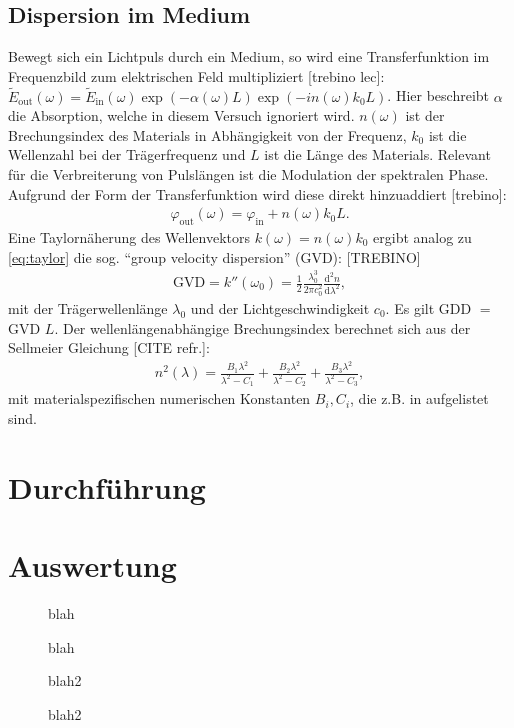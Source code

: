 \documentclass[twoside,        %
               BCOR12mm,       %
               english,ngerman, %
               fleqn,headsepline=false,footsepline=false
              ]{Vorlage/MFPREPORT}
\renewcommand{\d}{\ensuremath{\mathrm{d}}} %
\newcommand{\diff}[3][]{\ensuremath{\frac{\d^{#1}#2}{\d#3^{#1}}}} %
\begin{document}
\subsection{Dispersion im Medium}
Bewegt sich ein Lichtpuls durch ein Medium, so wird eine Transferfunktion im Frequenzbild zum elektrischen Feld multipliziert [trebino lec]: $\tilde E_{\text{out}}(\omega)=\tilde{E}_{\text{in}}(\omega)\exp(-\alpha(\omega)L)\exp(-i n(\omega)k_0L)$. Hier beschreibt $\alpha$ die Absorption, welche in diesem Versuch ignoriert wird. $n(\omega)$ ist der Brechungsindex des Materials in Abhängigkeit von der Frequenz, $k_0$ ist die Wellenzahl bei der Trägerfrequenz und $L$ ist die Länge des Materials. Relevant für die Verbreiterung von Pulslängen ist die Modulation der spektralen Phase. Aufgrund der Form der Transferfunktion wird diese direkt hinzuaddiert [trebino]:
\begin{align}
    \varphi_{\text{out}}(\omega)=\varphi_{\text{in}}+n(\omega)k_0L.
    \label{eq:transferphase}
\end{align}
Eine Taylornäherung des Wellenvektors $k(\omega)=n(\omega)k_0$ ergibt analog zu \cref{eq:taylor} die sog. ``group velocity dispersion'' (GVD): [TREBINO]
\begin{align}
    \text{GVD}=k''(\omega_0)=\frac{1}{2}\frac{\lambda_0^3}{2\pi c_0^2}\diff[2]{n}{\lambda},
    \label{eq:gvd}
\end{align}
mit der Trägerwellenlänge $\lambda_0$ und der Lichtgeschwindigkeit $c_0$.
Es gilt GDD $=$ GVD $ L$.
Der wellenlängenabhängige Brechungsindex berechnet sich aus der Sellmeier Gleichung [CITE refr.]:
\begin{align}
    n^2(\lambda)=\frac{B_1 \lambda^2}{\lambda^2-C_1}+\frac{B_2 \lambda^2}{\lambda^2-C_2}+\frac{B_3 \lambda^2}{\lambda^2-C_3},
    \label{eq:sellmeier}
\end{align}
mit materialspezifischen numerischen Konstanten $B_i, C_i$, die z.B. in \cite{refr} aufgelistet sind.
\section{Durchführung}

\label{sec:durchfuehrung}
\section{Auswertung}
\label{sec:auswertung}

\begin{figure}[]
    \centering
    
    \caption{blah}
    \label{fig:temp1}
\end{figure}
\begin{figure}[]
    \centering
    
    \caption{blah}
    \label{fig:spec1}
\end{figure}
\begin{figure}[]
    \centering
    
    \caption{blah2}
    \label{fig:temp2}
\end{figure}
\begin{figure}[]
    \centering
    
    \caption{blah2}
    \label{fig:spec2}
\end{figure}
\end{document}
